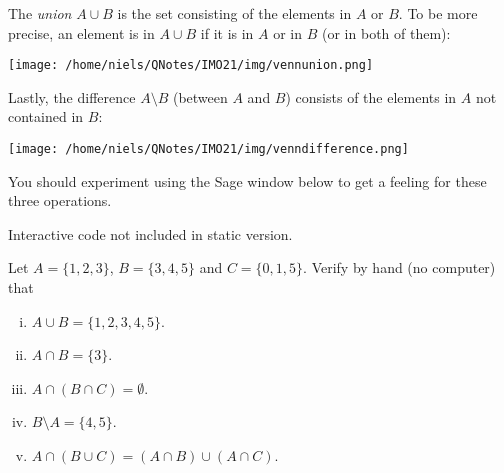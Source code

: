 The \emph{union} $A\cup B$ is the
set consisting of the elements in $A$ or $B$. To be more precise, an element is in
$A\cup B$ if it is in $A$ or in $B$ (or in both of them):

\begin{center}\texttt{[image: /home/niels/QNotes/IMO21/img/vennunion.png]}\end{center}

Lastly, the
difference $A\setminus B$ (between $A$ and $B$) consists of the elements
in $A$ not contained in $B$:

\begin{center}\texttt{[image: /home/niels/QNotes/IMO21/img/venndifference.png]}\end{center}

You should experiment using the Sage window below to get a feeling for these three operations.

\begin{sage} Interactive code not included in static version.\end{sage}

\begin{exercise}
  Let $A = \{1, 2, 3\}$, $B = \{3, 4, 5\}$ and $C = \{0, 1, 5\}$. Verify by hand (no computer) that
  \begin{enumerate}[(i)]
    \item
          $A\cup B = \{1, 2, 3, 4, 5\}$.
    \item
          $A\cap B = \{3\}$.
    \item
          $A\cap (B\cap C) = \emptyset$.
    \item
          $B\setminus A = \{4, 5\}$.
    \item
          $
            A \cap (B\cup C) = (A\cap B) \cup (A \cap C).
          $
  \end{enumerate}
\end{exercise}

